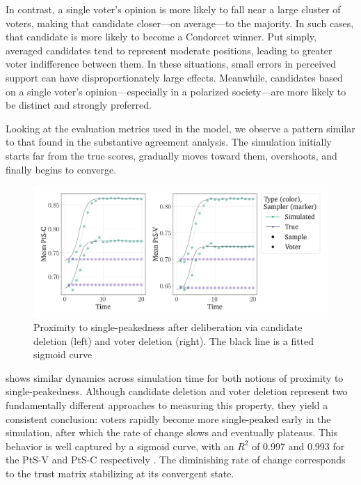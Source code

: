 \documentclass[11pt, oneside, dvipsnames]{Thesis} %
\begin{document}
In contrast, a single voter's opinion is more likely to fall near a large cluster of voters, making that candidate closer—on average—to the majority. In such cases, that candidate is more likely to become a Condorcet winner. Put simply, averaged candidates tend to represent moderate positions, leading to greater voter indifference between them. In these situations, small errors in perceived support can have disproportionately large effects. Meanwhile, candidates based on a single voter's opinion—especially in a polarized society—are more likely to be distinct and strongly preferred.

Looking at the evaluation metrics used in the model, we observe a pattern similar to that found in the substantive agreement analysis. The simulation initially starts far from the true scores, gradually moves toward them, overshoots, and finally begins to converge.

\begin{figure}[htbp]
	\centering
	\vspace{-9pt}
	\includegraphics[width=\textwidth]{Figures/pst_measures.png}
	\caption{Proximity to single-peakedness after deliberation via candidate deletion (left) and voter deletion (right). The black line is a fitted sigmoid curve}
	\label{fig:degroot_single_peaked}
\end{figure}

 shows similar dynamics across simulation time
for both notions of proximity to single-peakedness. Although candidate deletion
and voter deletion represent two fundamentally different approaches to
measuring this property, they yield a consistent conclusion: voters rapidly
become more single-peaked early in the simulation, after which the rate of
change slows and eventually plateaus. This behavior is well captured by a
sigmoid curve, with an $R^2$ of 0.997 and 0.993 for the PtS-V and PtS-C respectively . The diminishing
rate of change corresponds to the trust matrix stabilizing at its convergent
state.
\end{document}

